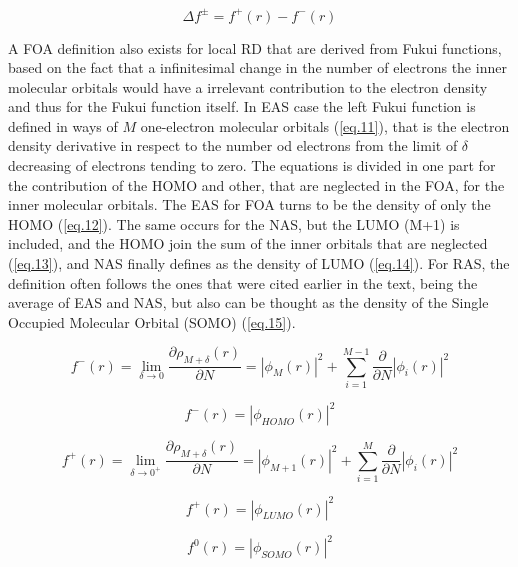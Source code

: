 \documentclass[a4paper,11pt]{refart}
\begin{document}
\begin{equation}
\Delta f^{\pm} = f^{+}(r) - f^{-}(r)
\label{eq.10}
\end{equation}

A FOA definition also exists for local RD that are derived from Fukui functions, based on the fact that a infinitesimal change in the number of electrons the inner molecular orbitals would have a irrelevant contribution to the electron density and thus for the Fukui function itself. In EAS case the left Fukui function is defined in ways of $M$ one-electron molecular orbitals (\autoref{eq.11}), that is the electron density derivative in respect to the number od electrons from the limit of $\delta$ decreasing of electrons tending to zero. The equations is divided in one part for the contribution of the HOMO and other, that are neglected in the FOA, for the inner molecular orbitals. The EAS for FOA turns to be the density of only the HOMO (\autoref{eq.12}). The same occurs for the NAS, but the LUMO (M+1) is included, and the HOMO join the sum of the inner orbitals that are neglected (\autoref{eq.13}), and NAS finally defines as the density of LUMO (\autoref{eq.14}).  For RAS, the definition often follows the ones that were cited earlier in the text, being the average of EAS and NAS, but also can be thought as the density of the Single Occupied Molecular Orbital (SOMO) (\autoref{eq.15}).

\begin{equation}
f^{-}(r) = \lim_{\delta \to 0} \frac{\partial \rho_{M+\delta}(r)}{\partial N} = |\phi_{M}(r)|^2  +\sum_{i=1}^{M-1} \frac{\partial}{\partial N} |\phi_i(r)|^2
\label{eq.11}
\end{equation}

\begin{equation}
f^{-}(r) = |\phi_{HOMO}(r)|^2 
\label{eq.12}
\end{equation}

\begin{equation}
f^{+}(r) = \lim_{\delta \to 0^+} \frac{\partial \rho_{M+\delta}(r)}{\partial N}	 =  |\phi_{M+1}(r)|^2 		 + \sum_{i=1}^{M} \frac{\partial}{\partial N} |\phi_i(r)|^2
\label{eq.13}
\end{equation}

\begin{equation}
f^{+}(r) = |\phi_{LUMO}(r)|^2 
\label{eq.14}
\end{equation}

\begin{equation}
f^{0}(r) = |\phi_{SOMO}(r)|^2 
\label{eq.15}
\end{equation}
\end{document}
